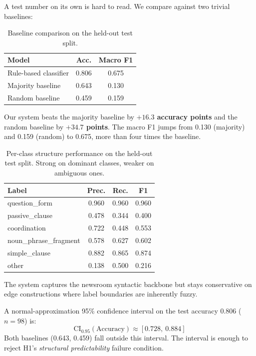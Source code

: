 \documentclass[11pt]{article}
\begin{document}
A test number on its own is hard to read. We compare against two trivial baselines:

\begin{table}[h]
\centering
\small
\begin{tabular}{lcc}
\toprule
\textbf{Model} & \textbf{Acc.} & \textbf{Macro F1} \\
\midrule
Rule-based classifier & 0.806 & 0.675 \\
Majority baseline & 0.643 & 0.130 \\
Random baseline & 0.459 & 0.159 \\
\bottomrule
\end{tabular}
\caption{Baseline comparison on the held-out test split.}
\label{tab:baselines}
\end{table}

Our system beats the majority baseline by \textbf{$+16.3$ accuracy points} and the random baseline by \textbf{$+34.7$ points}. The macro F1 jumps from 0.130 (majority) and 0.159 (random) to 0.675, more than four times the baseline.

\begin{table}[h]
\centering
\small
\begin{tabular}{lccc}
\toprule
\textbf{Label} & \textbf{Prec.} & \textbf{Rec.} & \textbf{F1} \\
\midrule
question\_form & 0.960 & 0.960 & 0.960 \\
passive\_clause & 0.478 & 0.344 & 0.400 \\
coordination & 0.722 & 0.448 & 0.553 \\
noun\_phrase\_fragment & 0.578 & 0.627 & 0.602 \\
simple\_clause & 0.882 & 0.865 & 0.874 \\
other & 0.138 & 0.500 & 0.216 \\
\bottomrule
\end{tabular}
\caption{Per-class structure performance on the held-out test split. Strong on dominant classes, weaker on ambiguous ones.}
\label{tab:perclass}
\end{table}

The system captures the newsroom syntactic backbone but stays conservative on edge constructions where label boundaries are inherently fuzzy.

A normal-approximation 95\% confidence interval on the test accuracy 0.806 ($n = 98$) is:
\begin{equation*}
\text{CI}_{0.95}(\text{Accuracy}) \approx [0.728,\ 0.884]
\end{equation*}
Both baselines (0.643, 0.459) fall outside this interval. The interval is enough to reject H1's \emph{structural predictability} failure condition.
\end{document}
